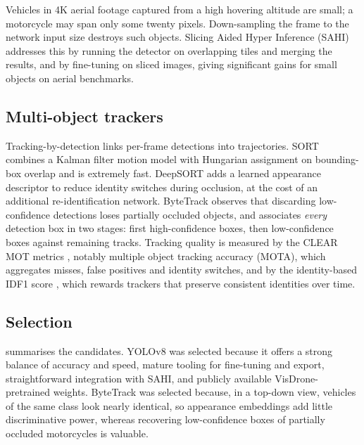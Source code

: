 Vehicles in 4K aerial footage captured from a high hovering altitude are small; a motorcycle may span only some twenty pixels.
Down-sampling the frame to the network input size destroys such objects. Slicing Aided Hyper Inference (SAHI)
\cite{akyon2022sahi} addresses this by running the detector on overlapping tiles and merging the results, and by
fine-tuning on sliced images, giving significant gains for small objects on aerial benchmarks.

\subsection{Multi-object trackers}
Tracking-by-detection links per-frame detections into trajectories. SORT \cite{bewley2016sort} combines a Kalman
filter motion model with Hungarian assignment on bounding-box overlap and is extremely fast. DeepSORT
\cite{wojke2017deepsort} adds a learned appearance descriptor to reduce identity switches during occlusion, at the
cost of an additional re-identification network. ByteTrack \cite{zhang2022bytetrack} observes that discarding
low-confidence detections loses partially occluded objects, and associates \emph{every} detection box in two
stages: first high-confidence boxes, then low-confidence boxes against remaining tracks. Tracking quality is
measured by the CLEAR MOT metrics \cite{bernardin2008clearmot}, notably multiple object tracking accuracy (MOTA),
which aggregates misses, false positives and identity switches, and by the identity-based IDF1 score
\cite{ristani2016idf1}, which rewards trackers that preserve consistent identities over time.

\subsection{Selection}
 summarises the candidates. YOLOv8 was selected because it offers a strong balance of
accuracy and speed, mature tooling for fine-tuning and export, straightforward integration with SAHI, and
publicly available VisDrone-pretrained weights. ByteTrack was selected because, in a top-down view, vehicles
of the same class look nearly identical, so appearance embeddings add little discriminative power, whereas
recovering low-confidence boxes of partially occluded motorcycles is valuable.

